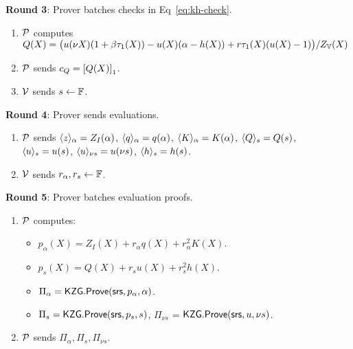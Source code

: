 \begin{figure}[htbp]
\begin{mdframed}
        {\bf Round 3}: Prover batches checks in Eq~\eqref{eq:kh-check}.
        \begin{enumerate}[leftmargin=1em, label=\arabic*.]
            \item $\prover$ computes $Q(X)=\big(u(\nu X)(1+\beta \tau_1(X)) - u(X)(\alpha - h(X)) + r\tau_1(X)(u(X)-1)\big)/Z_{\setV}(X)$
            \item $\prover$ sends $c_Q = \gone{Q(X)}$.
            \item $\verifier$ sends $s\gets \F$.
        \end{enumerate}

        {\bf Round 4}: Prover sends evaluations.
        \begin{enumerate}[leftmargin=1em, label=\arabic*.]
        \item $\prover$ sends $\val{\alpha}{z}=Z_I(\alpha)$, $\val{\alpha}{q}=q(\alpha)$, $\val{\alpha}{K}=K(\alpha)$,
        $\val{s}{Q}=Q(s)$, $\val{s}{u}=u(s)$, $\val{\nu s}{u}=u(\nu s)$, $\val{s}{h}=h(s)$.
        \item $\verifier$ sends $r_\alpha, r_s\gets \F$.
        \end{enumerate}

        {\bf Round 5}: Prover batches evaluation proofs.
        \begin{enumerate}[leftmargin=1em, label=\arabic*.]
        \item $\prover$ computes:
            \begin{itemize}[leftmargin=1em, label=-]
            \item $p_\alpha(X)=Z_I(X) + r_\alpha q(X) + r_\alpha^2 K(X)$.
            \item $p_s(X) = Q(X) + r_s u(X) + r_s^2 h(X)$.
            \item $\Pi_\alpha = \kzgprove(\srs,p_\alpha,\alpha)$.
            \item $\Pi_s = \kzgprove(\srs,p_s,s)$, $\Pi_{\nu s}$ = $\kzgprove(\srs,u,\nu s)$.
            \end{itemize}
        \item $\prover$ sends $\Pi_\alpha, \Pi_s, \Pi_{\nu s}$.
        \end{enumerate}


\end{mdframed}
\end{figure}
